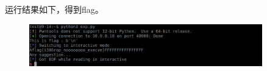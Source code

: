 \documentclass{article}
\begin{document}
    运行结果如下，得到flag。
    \begin{figure}[H]
    	\begin{center}
    		\includegraphics[width=0.9\textwidth]{8.png}
    	\end{center}
    \end{figure}

   
   
   
   
   
   
   
   
   
 
\end{document}
